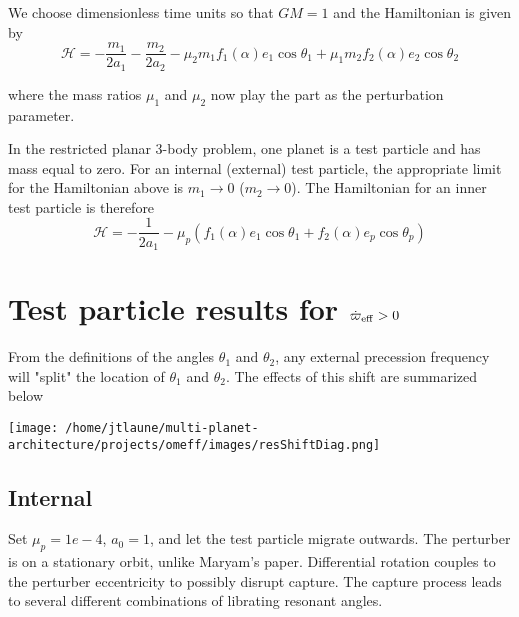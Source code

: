 \documentclass[11pt]{article}
\begin{document}
We choose dimensionless time units so that \(GM=1\) and
the Hamiltonian is given by
\begin{equation}
  \mathcal{H} = -\frac{m_1}{2a_1} -\frac{m_2}{2a_2} - \mu_2 m_1 f_1(\alpha) e_1 \cos\theta_1 + \mu_1 m_2 f_2(\alpha) e_2\cos\theta_2
\end{equation}

\noindent
where the mass ratios \(\mu_1\) and \(\mu_2\) now play the part as the perturbation parameter.

In the restricted planar 3-body problem, one planet is a test particle and has mass equal to zero.
For an internal (external) test particle,
the appropriate limit for the Hamiltonian above is \(m_1\to0\) (\(m_2\to0\)).
The Hamiltonian for an inner test particle is therefore
\begin{equation}
  \mathcal{H} = -\frac{1}{2a_1} - \mu_p( f_1(\alpha) e_1 \cos\theta_1 + f_2(\alpha) e_p\cos\theta_p)
\end{equation}

\noindent

\section{Test particle results for \(\dot\varpi_{\rm eff}>0\)}
\label{sec:org6288a20}
From the definitions of the angles \(\theta_1\) and \(\theta_2\),
any external precession frequency will "split" the location
of \(\theta_1\) and \(\theta_2\). The effects of this
shift are summarized below

\begin{center}
\texttt{[image: /home/jtlaune/multi-planet-architecture/projects/omeff/images/resShiftDiag.png]}
\end{center}

\subsection{Internal}
\label{sec:org2ab3394}
Set \(\mu_p=1e-4\), \(a_0=1\), and let the test particle migrate
outwards. The perturber is on a stationary orbit, unlike
Maryam's paper. Differential rotation couples to the
perturber eccentricity to possibly disrupt capture.
The capture process leads to several different
combinations of librating resonant angles.
\end{document}
